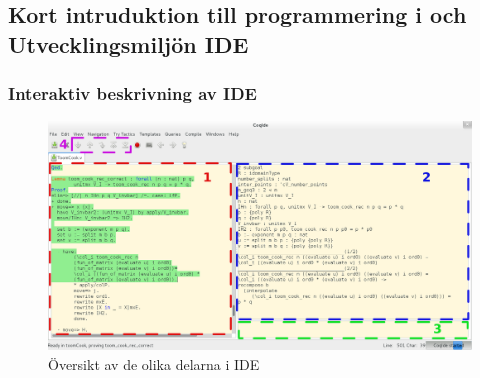 \subsection{Kort intruduktion till programmering i \coq och
Utvecklingsmiljön \coq IDE}

\subsubsection{Interaktiv beskrivning av \coq IDE}

\begin{figure}[H]
  \centering
  \includegraphics[width=\textwidth]{images/Overview}
  \caption[Översikt av \coq IDE]
   {Översikt av de olika delarna i \coq IDE}
\end{figure}

